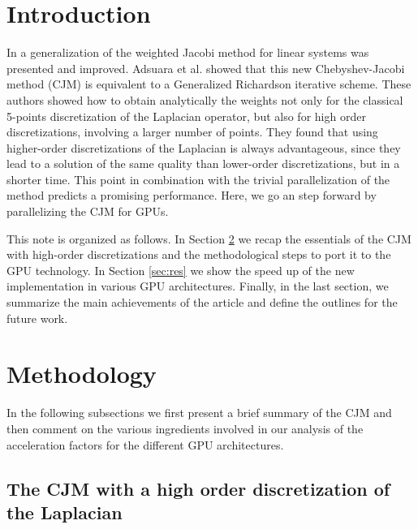 \documentclass[preprint,12pt]{elsarticle}
\begin{document}

\section{Introduction}
\label{sec:int}
In \cite{YangMittal2014, Adsuetal15, Adsuara2016369} a generalization
of the weighted Jacobi method for linear systems was
presented and improved. Adsuara et al.
\cite{Adsuara2017446} showed that this new Chebyshev-Jacobi
  method (CJM) is equivalent to a Generalized Richardson iterative
  scheme. These authors showed how to obtain analytically the weights
not only for the classical 5-points discretization of the Laplacian
operator, but also for high order discretizations, involving a larger number of points. They found that using higher-order discretizations of the
  Laplacian is always advantageous, since they lead to a solution of
the same quality than lower-order discretizations, but in
a shorter time. This point in combination with the trivial
parallelization of the method predicts a promising
performance. Here, we go an step forward by parallelizing the CJM for
GPUs.

This note is organized as follows. In Section \ref{sec:met} we
recap the essentials
  of the CJM with high-order discretizations and the
  methodological steps to port it to the GPU technology. In Section
\ref{sec:res} we show
  the speed up of the new implementation in various GPU
  architectures. Finally, in the last section, we summarize the main
achievements of the article and define the outlines for the future
work.

\section {Methodology}
\label{sec:met}

In the following subsections we first present a brief
  summary of the CJM and then comment on the various ingredients involved in our analysis of the
acceleration factors for the different GPU architectures.

\subsection{The CJM with a high order discretization of the Laplacian}
\label{subsec:cjHigOrd}
\end{document}
